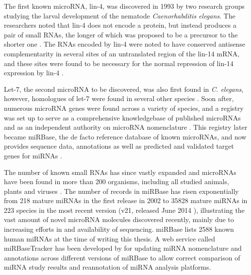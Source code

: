 The first known microRNA, lin-4, was discovered in 1993 by two research groups
studying the larval development of the nematode \emph{Caenorhabditis elegans}.
The researchers noted that lin-4 does not encode a protein, but instead
produces a pair of small RNAs, the longer of which was proposed to be a
precursor to the shorter one \citep{Lee1993}. The RNAs encoded by lin-4 were
noted to have conserved antisense complementarity in several sites of an
untranslated region of the lin-14 mRNA, and these sites were found to be
necessary for the normal repression of lin-14 expression by lin-4
\citep{Lee1993,Wightman1993}.

Let-7, the second microRNA to be discovered, was also first found in \emph{C.
elegans}, however, homologues of let-7 were found in several other species
\citep{Pasquinelli2000}. Soon after, numerous microRNA genes were found across
a variety of species, and a registry was set up to serve as a comprehensive
knowledgebase of published microRNAs and as an independent authority on
microRNA nomenclature \citep{GriffithsJones2004}. This registry later became
miRBase, the de facto reference database of known microRNAs, and now provides
sequence data, annotations as well as predicted and validated target genes for
miRNAs \citep{Kozomara2014}.

The number of known small RNAs has since vastly expanded
and microRNAs have been found in more than 200 organisms, including
all studied animals, plants \citep{JonesRhoades2006} and viruses \citep{Grundhoff2011}. 
The number of records in miRBase has risen exponentially
from %
218 mature miRNAs in the first release in 2002 to %
35828 mature miRNAs in 223 species in the most recent version (v21, released June
2014 \citep{VanPeer2014,MiRBaseWeb}), illustrating the vast amount of novel
microRNA molecules discovered recently, mainly due to increasing efforts in
and availability of sequencing. miRBase lists 2588 known human miRNAs at the
time of writing this thesis. A web service called miRBaseTracker has been
developed by \citet{VanPeer2014} for updating miRNA nomenclature and
annotations across different versions of miRBase to allow correct comparison
of miRNA study results and reannotation of miRNA analysis platforms.



